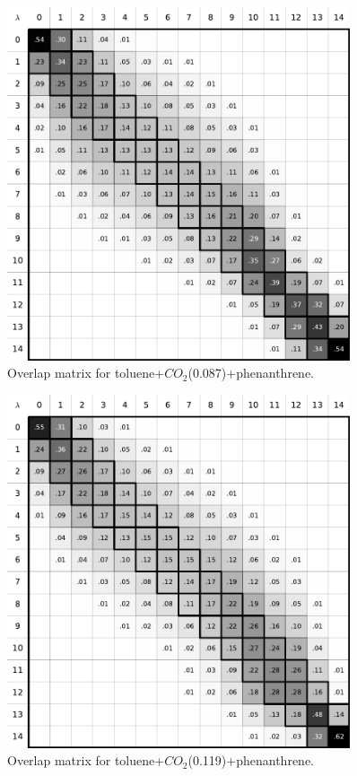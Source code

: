\documentclass[
	12pt,				%
	openany,			%
	oneside,			%
	a4paper,			%
	english,			%
	brazil				%
	]{abntex2}
\begin{document}
\begin{apendicesenv}
\begin{figure}[H]
	\centering
	\includegraphics[width=0.9\textwidth]{Figures/otolco2_1}
	\caption{Overlap matrix for toluene+$CO_{2}$(0.087)+phenanthrene.}
\end{figure}
\begin{figure}[H]
	\centering
	\includegraphics[width=0.9\textwidth]{Figures/otolco2_2}
	\caption{Overlap matrix for toluene+$CO_{2}$(0.119)+phenanthrene.}
\end{figure}


\end{apendicesenv}
\end{document}
